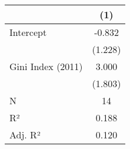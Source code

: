 \begin{table}[t]
\fontsize{12.0pt}{14.4pt}\selectfont
\begin{tabular*}{\linewidth}{@{\extracolsep{\fill}}lc}
\toprule
  & (1) \\ 
\midrule\addlinespace[2.5pt]
Intercept & -0.832 \\ 
 & (1.228) \\ 
Gini Index (2011) & 3.000 \\ 
{} & {(1.803)} \\ 
N & 14 \\ 
R² & 0.188 \\ 
Adj. R² & 0.120 \\ 
\bottomrule
\end{tabular*}
\end{table}

